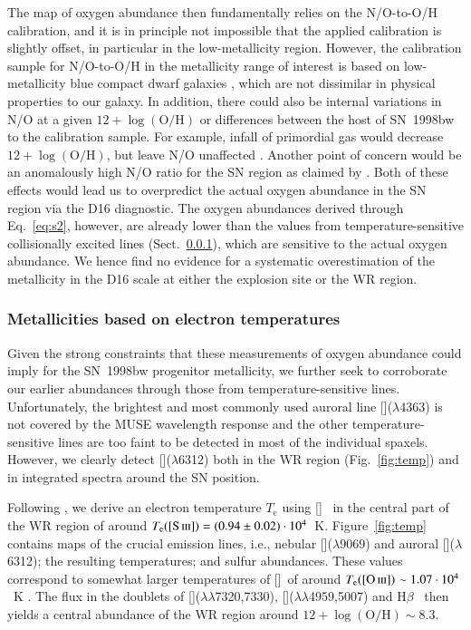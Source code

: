 \documentclass[traditabstract]{aa}
\newcommand{\hb}{H$\beta$}
\newcommand{\oh}{12+\log(\mathrm{O/H})}
\newcommand{\siii}{[\ion{S}{iii}]}
\newcommand{\oii}{[\ion{O}{ii}]}
\newcommand{\oiii}{[\ion{O}{iii}]}
\begin{document}
The map of oxygen abundance then fundamentally relies on the N/O-to-O/H calibration, and it is in principle not impossible that the applied calibration is slightly offset, in particular in the low-metallicity region. However, the calibration sample for N/O-to-O/H in the metallicity range of interest is based on low-metallicity blue compact dwarf galaxies \citep{1999ApJ...511..639I}, which are not dissimilar in physical properties to our {galaxy}. In addition, there could also be internal variations in N/O at a given $\oh$ or differences between the host of SN~1998bw to the calibration sample. For example, infall of primordial gas \citep[e.g.,][]{2015A&A...582A..78M} would decrease $\oh$, but leave N/O unaffected \citep{2016ApJ...823L..24K}. Another point of concern would be an anomalously high N/O ratio for the SN region as claimed by \citet{2006A&A...454..103H}. Both of these effects would lead us to overpredict the actual oxygen abundance in the SN region via the D16 diagnostic. {The oxygen abundances derived through Eq.~\ref{eq:s2}, however, are already lower than the values from temperature-sensitive collisionally excited lines (Sect.~\ref{teoh}), which are sensitive to the actual oxygen abundance. We hence find no evidence for a systematic overestimation of the metallicity in the D16 scale at either the explosion site or the WR region.}


\subsubsection{Metallicities based on electron temperatures}
\label{teoh}


Given the strong constraints that these measurements of oxygen abundance could imply for the SN~1998bw progenitor metallicity, we further seek to corroborate our earlier abundances through those from temperature-sensitive lines. Unfortunately, the brightest and most commonly used auroral line \oiii($\lambda$4363) is not covered by the MUSE wavelength response and the other temperature-sensitive lines are too faint to be detected in most of the individual spaxels. However, we clearly detect \siii($\lambda$6312) both in the WR region (Fig.~\ref{fig:temp}) and in integrated spectra around the SN position.

Following \citet{2013ApJS..207...21N}, we derive an electron temperature $T_\mathrm{e}$ using \siii~ in the central part of the WR region of around $T_{\mathrm{e}}({\siii})=(0.94\pm0.02)\cdot10^{4}$~K. Figure~\ref{fig:temp} contains maps of the crucial emission lines, i.e., nebular \siii($\lambda9069$) and auroral \siii($\lambda$6312); the resulting temperatures; and sulfur abundances. These values correspond to somewhat larger temperatures of \oiii~of around $T_{\mathrm{e}}(\oiii) \sim 1.07\cdot10^{4}$~K \citep{2006A&A...448..955I, 2012A&A...547A..29B}. The flux in the doublets of \oii($\lambda\lambda$7320,7330), \oiii($\lambda\lambda$4959,5007) and \hb~ then yields a central abundance of the WR region around $\oh \sim 8.3$.
\end{document}
